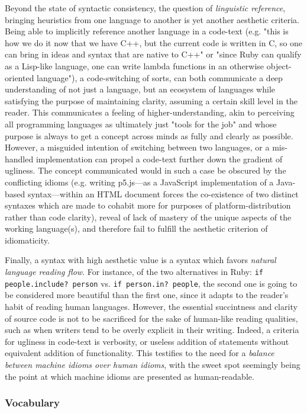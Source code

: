 Beyond the state of syntactic consistency, the question of \emph{linguistic reference}, bringing heuristics from one language to another is yet another aesthetic criteria. Being able to implicitly reference another language in a code-text (e.g. "this is how we do it now that we have C++, but the current code is written in C, so one can bring in ideas and syntax that are native to C++" or "since Ruby can qualify as a Lisp-like language, one can write lambda functions in an otherwise object-oriented language"), a code-switching of sorts, can both communicate a deep understanding of not just a language, but an ecosystem of languages while satisfying the purpose of maintaining clarity, assuming a certain skill level in the reader. This communicates a feeling of higher-understanding, akin to perceiving all programming languages as ultimately just "tools for the job" and whose purpose is always to get a concept across minds as fully and clearly as possible. However, a misguided intention of switching between two languages, or a mis-handled implementation can propel a code-text further down the gradient of ugliness. The concept communicated would in such a case be obscured by the conflicting idioms (e.g. writing p5.js—as a JavaScript implementation of a Java-based syntax—within an HTML document forces the co-existence of two distinct syntaxes which are made to cohabit more for purposes of platform-distribution rather than code clarity), reveal of lack of mastery of the unique aspects of the working language(s), and therefore fail to fulfill the aesthetic criterion of idiomaticity.

Finally, a syntax with high aesthetic value is a syntax which favors \emph{natural language reading flow}. For instance, of the two alternatives in Ruby: \lstinline{if people.include? person} vs. \lstinline{if person.in? people}, the second one is going to be considered more beautiful than the first one, since it adapts to the reader's habit of reading human languages. However, the essential succintness and clarity of source code is not to be sacrificed for the sake of human-like reading qualities, such as when writers tend to be overly explicit in their writing. Indeed, a criteria for ugliness in code-text is verbosity, or useless addition of statements without equivalent addition of functionality. This testifies to the need for a \emph{balance between machine idioms over human idioms}, with the sweet spot seemingly being the point at which machine idioms are presented as human-readable.

\subsubsection{Vocabulary}
\label{subsubsec:framework-vocabulary}

